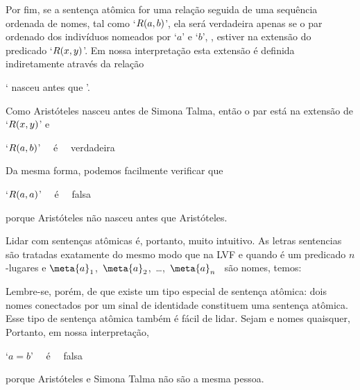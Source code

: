 Por fim, se a sentença atômica for uma relação seguida de uma sequência ordenada de nomes, tal como `$\mathord{R}(a,b)$', ela será verdadeira apenas se o par ordenado dos indivíduos nomeados por `$a$' e `$b$', , estiver na extensão do predicado `$\mathord{R}(x,y)$'.
Em nossa interpretação esta extensão é definida indiretamente através da relação
\begin{center}
	` nasceu antes que '.
\end{center}	
Como Aristóteles nasceu antes de Simona Talma, então o par  está na extensão de `$\mathord{R}(x,y)$' e
\begin{center}
	`$\mathord{R}(a,b)$' \ \ é \ \ verdadeira
\end{center}
Da mesma forma, podemos facilmente verificar que 
\begin{center}
	`$\mathord{R}(a,a)$' \ \ é \ \ falsa
\end{center}
porque Aristóteles não nasceu antes que Aristóteles.

Lidar com sentenças atômicas é, portanto, muito intuitivo.
As letras sentencias são tratadas exatamente do mesmo modo que na LVF e quando  é um predicado $n$-lugares e \mbox{$\meta{a}_1 $, $\meta{a}_{2}$, \dots, $\meta{a}_{n}$} \ são nomes, temos:

Lembre-se, porém, de que existe um tipo especial de sentença atômica: dois nomes conectados por um sinal de identidade constituem uma sentença atômica.
Esse tipo de sentença atômica também é fácil de lidar.
Sejam  e  nomes quaisquer,
Portanto, em nossa interpretação,
\begin{center}
	`$a=b$' \ \ é \ \ falsa
\end{center}
porque Aristóteles e Simona Talma não são a mesma pessoa.


